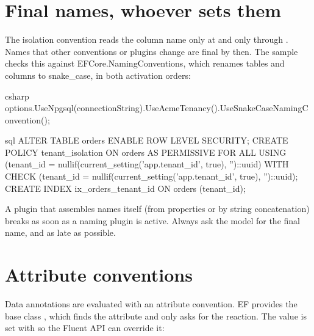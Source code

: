 \section{Final names, whoever sets them}

The isolation convention reads the column name only at 
and only through . Names
that other conventions or plugins change are final by then. The sample checks this against
EFCore.NamingConventions, which renames tables and columns to snake\_case, in both
activation orders:

\begin{sourcecode}[Usage]{csharp}
options.UseNpgsql(connectionString).UseAcmeTenancy().UseSnakeCaseNamingConvention();
\end{sourcecode}

\begin{sourcecode}{sql}
ALTER TABLE orders ENABLE ROW LEVEL SECURITY;
CREATE POLICY tenant_isolation ON orders AS PERMISSIVE FOR ALL
    USING (tenant_id = nullif(current_setting('app.tenant_id', true), '')::uuid)
    WITH CHECK (tenant_id = nullif(current_setting('app.tenant_id', true), '')::uuid);
CREATE INDEX ix_orders_tenant_id ON orders (tenant_id);
\end{sourcecode}

\begin{tip}
  A plugin that assembles names itself (from  properties or by string
  concatenation) breaks as soon as a naming plugin is active. Always ask the model for the
  final name, and as late as possible.
\end{tip}

\section{Attribute conventions}

Data annotations are evaluated with an attribute convention. EF provides the base class
,
which finds the attribute and only asks for the reaction. The value is set with
 so the Fluent API can override it:

